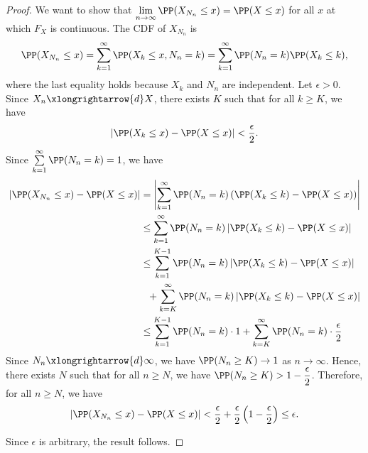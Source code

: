 \begin{proof}
  We want to show that $\lim\limits_{n \to \infty} \PP(X_{N_n} \le x) = \PP(X \le x)$ for all $x$ at which $F_X$ is continuous. The CDF of $X_{N_n}$ is
  $$\PP(X_{N_n} \le x) = \sum_{k=1}^\infty \PP(X_k \le x, N_n = k) = \sum_{k=1}^\infty\PP(N_n = k)\PP(X_k\le k),$$
  where the last equality holds because $X_k$ and $N_n$ are independent. Let $\epsilon > 0$. Since $X_n \xlongrightarrow{d} X$, there exists $K$ such that for all $k\ge K$, we have
  $$|\PP(X_k \le x) - \PP(X \le x)| < \dfrac{\epsilon}{2}.$$
  Since $\sum\limits_{k=1}^\infty\PP(N_n = k) = 1$, we have
  \begin{align*}
    \left|\PP(X_{N_n} \le x) - \PP(X \le x)\right|
     & = \left|\sum_{k=1}^\infty\PP(N_n = k)\left(\PP(X_k\le k) - \PP(X \le x)\right)\right|               \\
     & \le \sum_{k=1}^\infty\PP(N_n = k)\left|\PP(X_k\le k) - \PP(X \le x)\right|                          \\
     & \le \sum_{k=1}^{K-1}\PP(N_n = k)\left|\PP(X_k\le k) - \PP(X \le x)\right|                           \\
     & \,\,\,\, +  \sum_{k=K}^\infty\PP(N_n = k)\left|\PP(X_k\le k) - \PP(X \le x)\right|                  \\
     & \le \sum_{k=1}^{K-1}\PP(N_n = k) \cdot 1 +  \sum_{k=K}^\infty\PP(N_n = k) \cdot \dfrac{\epsilon}{2} \\
  \end{align*}
  Since $N_n \xlongrightarrow{d} \infty$, we have $\PP(N_n \ge K) \to 1$ as $n \to \infty$. Hence, there exists $N$ such that for all $n\ge N$, we have $\PP(N_n \ge K) > 1 - \dfrac{\epsilon}{2}$. Therefore, for all $n\ge N$, we have
  $$\left|\PP(X_{N_n} \le x) - \PP(X \le x)\right| < \dfrac{\epsilon}{2} + \dfrac{\epsilon}{2}\left(1- \dfrac{\epsilon}{2}\right) \le \epsilon.$$

  Since $\epsilon$ is arbitrary, the result follows.
\end{proof}
